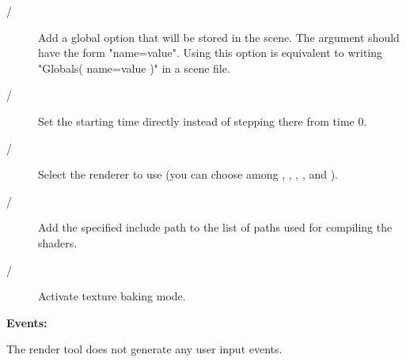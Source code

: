 \begin{description}
\item[ / ]
Add a global option that will be stored in the scene. The argument should
have the form "name=value". Using this option is equivalent to writing
"Globals( name=value )" in a scene file.

\item[ / ]
Set the starting time directly instead of stepping there from time 0.

\item[ / ]
Select the renderer to use (you can choose among ,
, , ,  and ).

\item[ / ]
Add the specified include path to the list of paths used for compiling
the shaders.

\item[ / ]
Activate texture baking mode.

\end{description}

{\bf Events:}

The render tool does not generate any user input events.
